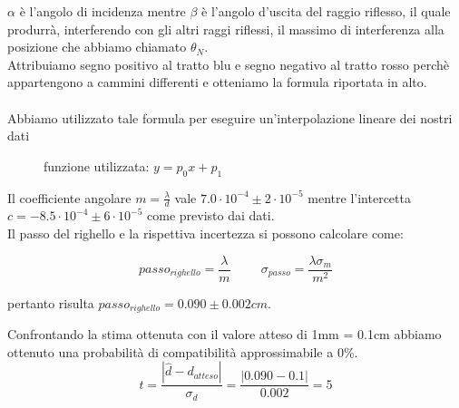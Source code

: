 \documentclass{article}
\theoremstyle{definition}
\begin{document}
\begin{figure}[!ht]
    	\captionsetup{labelformat=empty}
\end{figure}

\pagebreak

\noindent \(\alpha \) è l'angolo di incidenza mentre \(\beta\) è l'angolo d'uscita del raggio riflesso, il quale produrrà, interferendo con gli altri raggi riflessi, il massimo di interferenza alla posizione che abbiamo chiamato \(\theta_{N}\).\\
Attribuiamo segno positivo al tratto blu e segno negativo al tratto rosso perchè appartengono a cammini differenti e otteniamo la formula riportata in alto.\\\\

\noindent Abbiamo utilizzato tale formula per eseguire un'interpolazione lineare dei nostri dati

\begin{figure}[!ht]
    	\captionsetup{labelformat=empty}
	
    \caption{funzione utilizzata: $y = p_{0}x+p_{1}$}
\end{figure}
\pagebreak
\noindent Il coefficiente angolare \(m = \frac{\lambda}{d}\)  vale \(7.0 \cdot 10^{-4}\pm 2 \cdot 10^{-5}\) mentre l'intercetta \( c = -8.5 \cdot 10^{-4} \pm  6 \cdot 10^{-5}\) come previsto dai dati.\\

\noindent Il passo del righello e la rispettiva incertezza si possono calcolare come:

 \[passo_{righello} = \frac{\lambda}{m} \hspace{1cm} \sigma_{passo} = \frac{\lambda \sigma_m}{m^{2}}\] 
   
\noindent pertanto risulta \(passo_{righello} =  0.090\pm0.002cm \).

\noindent Confrontando la stima ottenuta con il valore atteso di 1mm = 0.1cm abbiamo ottenuto una probabilità di compatibilità approssimabile a 0\%.
\[t = \frac{\left |\hat{d}-d_{atteso}\right|}{\sigma_{d}}= \frac{ \left |
0.090 - 0.1\right |}{0.002} = 5 \]
\end{document}
